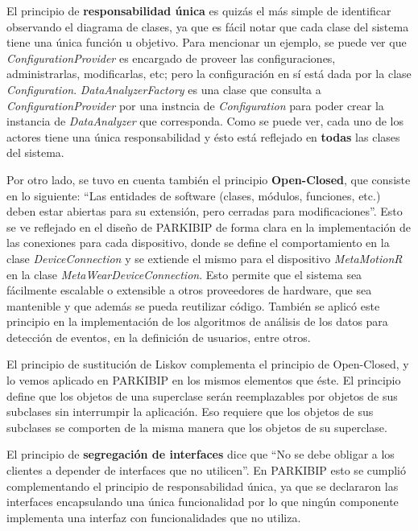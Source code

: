 El principio de \textbf{responsabilidad única} es quizás el más simple de identificar observando el diagrama de clases, ya que es fácil notar que cada clase del sistema tiene una única función u objetivo. Para mencionar un ejemplo, se puede ver que \textit{ConfigurationProvider} es encargado de proveer las configuraciones, administrarlas, modificarlas, etc; pero la configuración en sí está dada por la clase \textit{Configuration}. \textit{DataAnalyzerFactory} es una clase que consulta a \textit{ConfigurationProvider} por una instncia de \textit{Configuration} para poder crear la instancia de \textit{DataAnalyzer} que corresponda. Como se puede ver, cada uno de los actores tiene una única responsabilidad y ésto está reflejado en \textbf{todas} las clases del sistema. 

Por otro lado, se tuvo en cuenta también el principio \textbf{Open-Closed}, que consiste en lo siguiente: ``Las entidades de software (clases, módulos, funciones, etc.) deben estar abiertas para su extensión, pero cerradas para modificaciones''. Esto se ve reflejado en el diseño de PARKIBIP de forma clara en la implementación de las conexiones para cada dispositivo, donde se define el comportamiento en la clase \textit{DeviceConnection} y se extiende el mismo para el dispositivo \textit{MetaMotionR} en la clase \textit{MetaWearDeviceConnection}. Esto permite que el sistema sea fácilmente escalable o extensible a otros proveedores de hardware, que sea mantenible y que además se pueda reutilizar código. También se aplicó este principio en la implementación de los algoritmos de análisis de los datos para detección de eventos, en la definición de usuarios, entre otros. 

El principio de sustitución de Liskov complementa el principio de Open-Closed, y lo vemos aplicado en PARKIBIP en los mismos elementos que éste. El principio define que los objetos de una superclase serán reemplazables por objetos de sus subclases sin interrumpir la aplicación. Eso requiere que los objetos de sus subclases se comporten de la misma manera que los objetos de su superclase. 

El principio de \textbf{segregación de interfaces} dice que ``No se debe obligar a los clientes a depender de interfaces que no utilicen''. En PARKIBIP esto se cumplió complementando el principio de responsabilidad única, ya que se declararon las interfaces encapsulando una única funcionalidad por lo que ningún componente implementa una interfaz con funcionalidades que no utiliza. 

